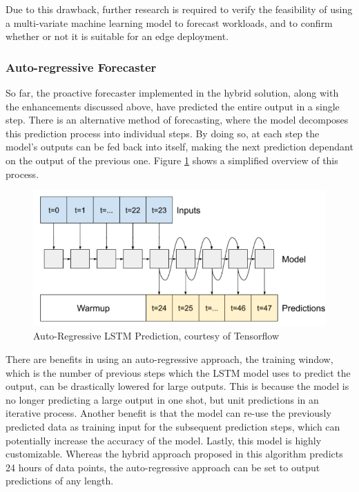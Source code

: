 Due to this drawback, further research is required to verify the feasibility of using a multi-variate machine learning model to forecast workloads, and to confirm whether or not it is suitable for an edge deployment.

\subsubsection{Auto-regressive Forecaster}
\label{subsubsec:ch6-auto-regressive}

So far, the proactive forecaster implemented in the hybrid solution, along with the enhancements discussed above, have predicted the entire output in a single step. There is an alternative method of forecasting, where the model decomposes this prediction process into individual steps. By doing so, at each step the model's outputs can be fed back into itself, making the next prediction dependant on the output of the previous one. Figure \ref{fig:auto-regressive-lstm} shows a simplified overview of this process.\par

\begin{figure}[htb]
    \centering
    \caption{Auto-Regressive LSTM Prediction, courtesy of Tensorflow \cite{autoregressivelstm}}
    \label{fig:auto-regressive-lstm}
    \includegraphics[width=0.6\linewidth]{Figures/Auto-Regressive-LSTM.png}
\end{figure}

There are benefits in using an auto-regressive approach, the training window, which is the number of previous steps which the LSTM model uses to predict the output, can be drastically lowered for large outputs. This is because the model is no longer predicting a large output in one shot, but unit predictions in an iterative process. Another benefit is that the model can re-use the previously predicted data as training input for the subsequent prediction steps, which can potentially increase the accuracy of the model. Lastly, this model is highly customizable. Whereas the hybrid approach proposed in this algorithm predicts 24 hours of data points, the auto-regressive approach can be set to output predictions of any length.\par

